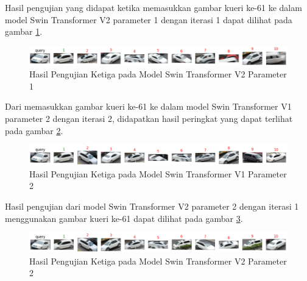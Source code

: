 Hasil pengujian yang didapat ketika memasukkan gambar kueri ke-61 ke dalam model Swin Transformer V2 parameter 1 dengan 
iterasi 1 dapat dilihat pada gambar \ref{fig:hasilpengujianketigapadamodelswintransformerv2param1}.

\begin{figure}[h!]
  \centering
  \includegraphics[scale=0.6]{gambar/Que61V2P1IT1.png}
  \caption{Hasil Pengujian Ketiga pada Model Swin Transformer V2 Parameter 1}
  \label{fig:hasilpengujianketigapadamodelswintransformerv2param1}
\end{figure}

Dari memasukkan gambar kueri ke-61 ke dalam model Swin Transformer V1 parameter 2 dengan iterasi 2, didapatkan hasil 
peringkat yang dapat terlihat pada gambar \ref{fig:hasilpengujianketigapadamodelswintransformerv1param2}.

\begin{figure}[h!]
  \centering
  \includegraphics[scale=0.6]{gambar/Que61V1P2IT2.png}
  \caption{Hasil Pengujian Ketiga pada Model Swin Transformer V1 Parameter 2}
  \label{fig:hasilpengujianketigapadamodelswintransformerv1param2}
\end{figure}

Hasil pengujian dari model Swin Transformer V2 parameter 2 dengan iterasi 1 menggunakan gambar kueri ke-61 dapat 
dilihat pada gambar \ref{fig:hasilpengujianketigapadamodelswintransformerv2param2}.

\begin{figure}[h!]
  \centering
  \includegraphics[scale=0.6]{gambar/Que61V2P2IT1.png}
  \caption{Hasil Pengujian Ketiga pada Model Swin Transformer V2 Parameter 2}
  \label{fig:hasilpengujianketigapadamodelswintransformerv2param2}
\end{figure}


